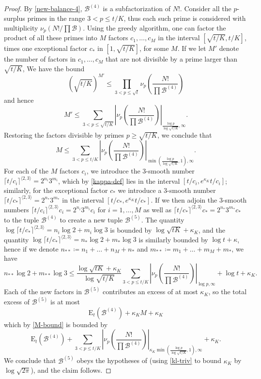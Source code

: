 \documentclass[12pt,a4paper,reqno]{amsart}
\numberwithin{equation}{section}
\theoremstyle{plain}
\theoremstyle{definition}
\newcommand\tuple{{\mathcal B}}
\newcommand\excess{{\mathrm{E}}}
\begin{document}
\begin{proof} By \eqref{new-balance-4}, $\tuple^{(4)}$ is a subfactorization of $N!$. Consider all the $p$-surplus primes in the range $3 < p \leq t/K$, thus each such prime is considered with multiplicity $\nu_p(N!/\prod \tuple)$.  
Using the greedy algorithm, one can factor the product of all these primes into $M$ factors $c_1,\dots,c_M$ in the interval $[\sqrt{t/K}, t/K]$, times one exceptional factor $c_*$ in $[1,\sqrt{t/K}]$, for some $M$.  If we let $M'$ denote the number of factors in $c_1,\dots,c_M$ that are not divisible by a prime larger than $\sqrt{t/K}$, We have the bound
$$ (\sqrt{t/K})^{M'} \leq
\prod_{3 < p \leq \sqrt{t}} \nu_p\left(\frac{N!}{\prod \tuple^{(4)}}\right)$$
and hence
$$
M' \leq \sum_{3 < p \leq \sqrt{t/K}}
\left|\nu_p\left(\frac{N!}{\prod \tuple^{(4)}}\right)\right|_{\frac{\log p}{\log\sqrt{t/K}},\infty}. 
$$
Restoring the factors divisible by primes $p \geq \sqrt{t/K}$, we conclude that 
\begin{equation}\label{M-bound}  M \leq \sum_{3 < p \leq t/K}
\left|\nu_p\left(\frac{N!}{\prod \tuple^{(4)}}\right)\right|_{\min(\frac{\log p}{\log\sqrt{t/K}},1),\infty}. \end{equation}
For each of the $M$ factors $c_i$, we introduce the $3$-smooth number $\lceil t/c_i\rceil^{\langle 2,3\rangle} = 2^{n_i} 3^{m_i}$, which by \eqref{kappa-def} lies in the interval $[t/c_i,e^{\kappa_K} t/c_i]$; similarly, for the exceptional factor $c_*$ we introduce a $3$-smooth number $\lceil t/c_* \rceil^{\langle 2,3 \rangle} = 2^{n_*} 3^{m_*}$ in the interval $[t/c_*,e^{\kappa_K} t/c_*]$.  If we then adjoin the $3$-smooth numbers $\lceil t/c_i\rceil^{\langle 2,3\rangle} c_i = 2^{n_i} 3^{m_i} c_i$ for $i=1,\dots,M$ as well as $\lceil t/c_*\rceil^{\langle 2,3\rangle} c_* = 2^{n_*} 3^{m_*} c_*$ to the tuple $\tuple^{(4)}$ to create a new tuple $\tuple^{(5)}$.  The quantity $\log \lceil t/c_*\rceil^{\langle 2,3\rangle} = n_i \log 2 + m_i \log 3$ is bounded by $\log \sqrt{tK} + \kappa_K$, and the quantity $\log \lceil t/c_*\rceil^{\langle 2,3\rangle}  = n_* \log 2 + m_* \log 3$ is similarly bounded by $\log t + \kappa$, hence if we denote $n_{**} \coloneqq n_1 + \dots + n_M + n_*$ and $m_{**} \coloneqq m_1 + \dots + m_M + m_*$, we have
$$ n_{**} \log 2 + m_{**} \log 3 \leq 
\frac{\log \sqrt{tK} + \kappa_K}{\log\sqrt{t/K}}
\sum_{3 < p \leq t/K}
\left|\nu_p\left(\frac{N!}{\prod \tuple^{(4)}}\right)\right|_{\log p,\infty}
+ \log t + \kappa_K.$$
Each of the new factors in $\tuple^{(5)}$ contributes an excess of at most $\kappa_K$, so the total excess of $\tuple^{(5)}$ is at most
$$ \excess_t(\tuple^{(4)}) + \kappa_K M + \kappa_K$$
which by \eqref{M-bound} is bounded by
$$ \excess_t(\tuple^{(4)}) + \sum_{3 < p \leq t/K}
\left|\nu_p\left(\frac{N!}{\prod \tuple^{(4)}}\right)\right|_{\kappa_K \min(\frac{\log p}{\log\sqrt{t/K}},1),\infty} + \kappa_K.$$
We conclude that $\tuple^{(5)}$ obeys the hypotheses of  (using \eqref{kl-triv} to bound $\kappa_K$ by $\log \sqrt{2\pi}$), and the claim follows.
\end{proof}
\end{document}

